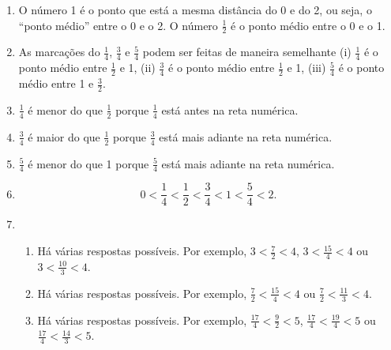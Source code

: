 \begin{atividade}
\solucao
\begin{center}
\end{center}


\begin{enumerate}
    \item      O número 1 é o ponto que está a mesma distância do 0 e do 2, ou seja, o ``ponto médio'' entre o 0 e o 2. O número $\frac{1}{2}$ é o ponto médio entre o 0 e o 1.

\item  As marcações do $\frac{1}{4}$, $\frac{3}{4}$ e $\frac{5}{4}$ podem ser feitas de maneira semelhante (i) $\frac{1}{4}$ é o ponto médio entre $\frac{1}{2}$ e 1, (ii) $\frac{3}{4}$ é o ponto médio entre $\frac{1}{2}$ e 1, (iii) $\frac{5}{4}$ é o ponto médio entre 1 e $\frac{3}{2}$.
    \item       $\frac{1}{4}$       é menor do que       $\frac{1}{2}$       porque $\frac{1}{4}$ está antes na reta numérica.
    \item       $\frac{3}{4}$       é maior do que        $\frac{1}{2}$       porque $\frac{3}{4}$ está mais adiante na reta numérica.
    \item       $\frac{5}{4}$       é menor do que 1 porque $\frac{5}{4}$ está mais adiante na reta numérica.
    \item       $$0 < \frac{1}{4} < \frac{1}{2}< \frac{3}{4} < 1 < \frac{5}{4} < 2.$$
    \item \mbox{ }
      
      \begin{enumerate}
    \item Há várias respostas possíveis. Por exemplo,       $3 < \frac{7}{2} < 4$,       $3 < \frac{15}{4} < 4$         ou         $3 < \frac{10}{3} < 4$.
    \item       Há várias respostas possíveis. Por exemplo,       $\frac{7}{2} < \frac{15}{4} < 4$ ou $\frac{7}{2} < \frac{11}{3} < 4$.
    \item       Há várias respostas possíveis. Por exemplo,       $\frac{17}{4} < \frac{9}{2} < 5$, $\frac{17}{4} < \frac{19}{4} < 5$ ou $\frac{17}{4} < \frac{14}{3} < 5$.
      \end{enumerate}
     
\end{enumerate} %

\end{atividade}
